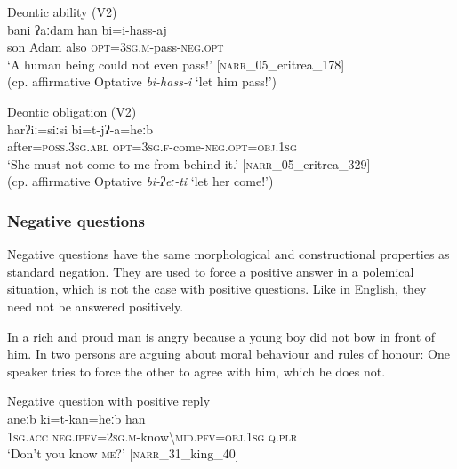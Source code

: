 \documentclass[output=paper,colorlinks,citecolor=brown]{langscibook}
\begin{document}
\ea\label{ex:beja:11}
Deontic ability (V2)\\
    \gll bani ʔaːdam han bi=i-hass-aj\\
         son Adam also \textsc{opt=3sg.m}{}-pass-\textsc{neg.opt}\\
    \glt `A human being could not even pass!' [\textsc{narr}\_05\_eritrea\_178]
    \\ (cp. affirmative Optative \textit{bi-hass-i} `let him pass!') 
\z 

\ea\label{ex:beja:12} 
Deontic obligation (V2)\\
    \gll harʔiː=siːsi bi=t-jʔ-a=heːb\footnotemark{} \\
         after=\textsc{poss.3sg.abl} \textsc{opt=3sg.f}-come-\textsc{neg.opt=obj.1sg}\\
    \glt `She must not come to me from behind it.' [\textsc{narr}\_05\_eritrea\_329]
    \\ (cp. affirmative Optative \textit{bi-ʔeː-ti} `let her come!') 
\z

\subsubsection{Negative questions}

Negative questions have the same morphological and constructional properties as standard negation. They are used to force a positive answer in a polemical situation, which is not the case with positive questions. Like in English, they need not be answered positively. 

In  a rich and proud man is angry because a young boy did not bow in front of him. In  two persons are arguing about moral behaviour and rules of honour: One speaker tries to force the other to agree with him, which he does not.

\ea\label{ex:beja:13}
{Negative question with positive reply}\\
    \gll aneːb ki=t-kan=heːb han\\
         \textsc{1sg.acc} \textsc{neg.ipfv=2sg.m}-know{\textbackslash}\textsc{mid.pfv=obj.1sg} \textsc{q.plr}\\
    \glt `Don’t you know \textsc{me?}' [\textsc{narr}\_31\_king\_40]
\z 

\end{document}

